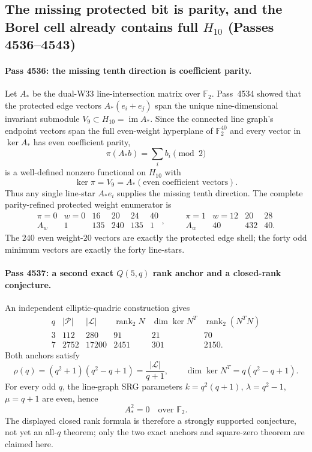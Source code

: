 \subsection{The missing protected bit is parity, and the Borel cell already contains full $H_{10}$ (Passes 4536--4543)}
\label{sec:pass4536-4543-parity-decoder}

\paragraph{Pass 4536: the missing tenth direction is coefficient parity.}
Let $A_*$ be the dual-W33 line-intersection matrix over $\mathbb F_2$.  Pass~4534
showed that the protected edge vectors $A_*(e_i+e_j)$ span the unique
nine-dimensional invariant submodule $V_9\subset H_{10}=\operatorname{im}A_*$.  Since
the connected line graph's endpoint vectors span the full even-weight hyperplane
of $\mathbb F_2^{40}$ and every vector in $\ker A_*$ has even coefficient parity,
\[
 \boxed{\pi(A_*b)=\sum_i b_i\pmod2}
\]
is a well-defined nonzero functional on $H_{10}$ with
\[
 \ker\pi=V_9=A_*(\text{even coefficient vectors}).
\]
Thus any single line-star $A_*e_i$ supplies the missing tenth direction.  The
complete parity-refined protected weight enumerator is
\[
\begin{array}{c|ccccc}
\pi=0&w=0&16&20&24&40\\ \hline
A_w&1&135&240&135&1
\end{array},\qquad
\begin{array}{c|ccc}
\pi=1&w=12&20&28\\ \hline
A_w&40&432&40.
\end{array}
\]
The $240$ even weight-$20$ vectors are exactly the protected edge shell; the
forty odd minimum vectors are exactly the forty line-stars.

\paragraph{Pass 4537: a second exact $Q(5,q)$ rank anchor and a closed-rank conjecture.}
An independent elliptic-quadric construction gives
\[
\begin{array}{c|ccccc}
q&|\mathcal P|&|\mathcal L|&\operatorname{rank}_2N&\dim\ker N^T&\operatorname{rank}_2(N^TN)\\ \hline
3&112&280&91&21&70\\
7&2752&17200&2451&301&2150.
\end{array}
\]
Both anchors satisfy
\[
 \rho(q)=(q^2+1)(q^2-q+1)=\frac{|\mathcal L|}{q+1},\qquad
 \dim\ker N^T=q(q^2-q+1).
\]
For every odd $q$, the line-graph SRG parameters
$k=q^2(q+1)$, $\lambda=q^2-1$, $\mu=q+1$ are even, hence
\[
 \boxed{A_*^2=0\quad\text{over }\mathbb F_2}.
\]
The displayed closed rank formula is therefore a strongly supported conjecture,
not yet an all-$q$ theorem; only the two exact anchors and square-zero theorem
are claimed here.

